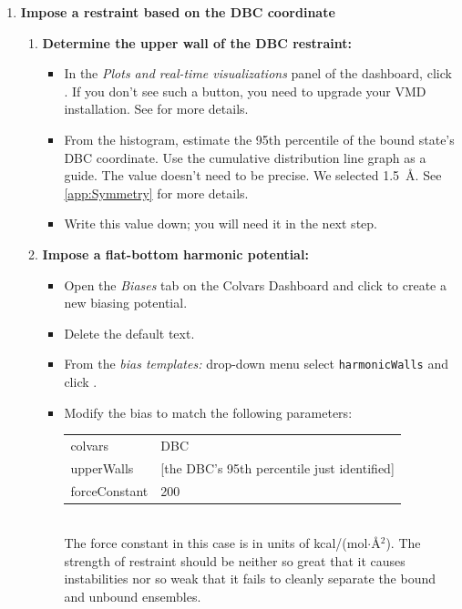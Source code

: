\documentclass[9pt,tutorial,pubversion]{Styling/livecoms}
\newcommand{\button}[1]{\inlineBox[gray]{\texttt{#1}}}
\newcommand{\menu}[1]{\textit{#1}}
\newcommand{\option}[1]{\texttt{#1}}
\begin{document}
\begin{enumerate}
        
        \item \textbf{Impose a restraint based on the DBC coordinate}
        \begin{enumerate}[label=\alph*., ref=\theenumi.\alph*]
            \item \textbf{Determine the upper wall of the DBC restraint:}
            \begin{itemize}
                \item In the \menu{Plots and real-time visualizations} panel of the dashboard, click \button{Histogram}. 
                If you don't see such a button, you need to upgrade your VMD installation. See  for more details.
                \item From the histogram, estimate the 95th percentile of the bound state's DBC coordinate. Use the cumulative distribution line graph as a guide. The value doesn't need to be precise.  We selected 1.5~\AA. See \ref{app:Symmetry} for more details.
                \item Write this value down; you will need it in the next step. 
            \end{itemize}
            \item \textbf{Impose a flat-bottom harmonic potential:}
            \label{step:createDBC}
            \begin{itemize}
                \item Open the \menu{Biases} tab on the Colvars Dashboard and click \button{New bias [Ctrl-n]} to create a new biasing potential.
                \item Delete the default text.
                \item From the \menu{bias templates:} drop-down menu select \option{harmonicWalls} and click \button{Insert [Enter]}.
                \item Modify the bias to match the following parameters: \\
                { \ttfamily
                \begin{tabular}{l l}
                    colvars & DBC\\
                    upperWalls & [the DBC's 95th percentile just identified]\\
                    forceConstant & 200 \\
                \end{tabular} }\\
                The force constant in this case is in units of kcal/(mol$\cdot$\AA{}$^2$). The strength of restraint should be neither so great that it causes instabilities nor so weak that it fails to cleanly separate the bound and unbound ensembles.

\end{itemize}
\end{enumerate}
\end{enumerate}
\end{document}

